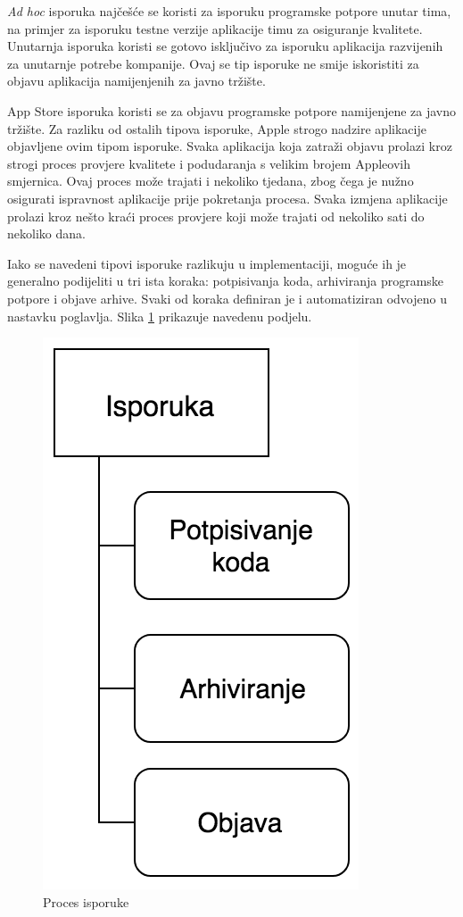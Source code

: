 \documentclass[times, utf8, diplomski, numeric]{fer}
\begin{document}
\textit{Ad hoc} isporuka najčešće se koristi za isporuku programske potpore unutar tima, na primjer za isporuku testne verzije aplikacije timu za osiguranje kvalitete. Unutarnja isporuka koristi se gotovo isključivo za isporuku aplikacija razvijenih za unutarnje potrebe kompanije. Ovaj se tip isporuke ne smije iskoristiti za objavu aplikacija namijenjenih za javno tržište.

App Store isporuka koristi se za objavu programske potpore namijenjene za javno tržište. Za razliku od ostalih tipova isporuke, Apple strogo nadzire aplikacije objavljene ovim tipom isporuke. Svaka aplikacija koja zatraži objavu prolazi kroz strogi proces provjere kvalitete i podudaranja s velikim brojem Appleovih smjernica. Ovaj proces može trajati i nekoliko tjedana, zbog čega je nužno osigurati ispravnost aplikacije prije pokretanja procesa. Svaka izmjena aplikacije prolazi kroz nešto kraći proces provjere koji može trajati od nekoliko sati do nekoliko dana.

Iako se navedeni tipovi isporuke razlikuju u implementaciji, moguće ih je generalno podijeliti u tri ista koraka: potpisivanja koda, arhiviranja programske potpore i objave arhive. Svaki od koraka definiran je i automatiziran odvojeno u nastavku poglavlja. Slika \ref{fig:ContinuousDelivery} prikazuje navedenu podjelu.

\begin{figure}
\centering
\includegraphics[scale=0.6]{ContinuousDelivery}
\caption{Proces isporuke}
\label{fig:ContinuousDelivery}
\end{figure}
\end{document}
